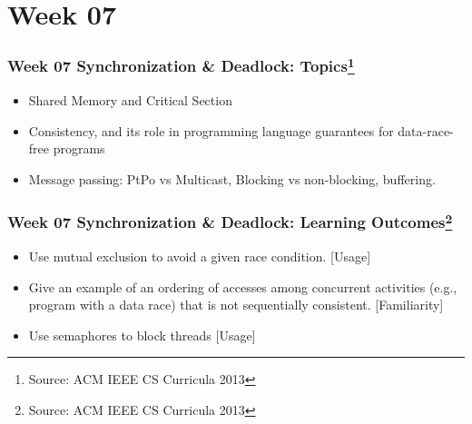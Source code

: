 
\section{Week 07}
\begin{frame}[fragile]
\frametitle{Week 07 Synchronization \& Deadlock:
Topics\footnote{Source: ACM IEEE CS Curricula 2013}}

\begin{itemize}
\item Shared Memory and Critical Section
\item Consistency, and its role in programming language guarantees for data-race-free programs
\item Message passing: PtPo vs Multicast, Blocking vs non-blocking, buffering.
\end{itemize}
\end{frame}

\begin{frame}[fragile]
\frametitle{Week 07 Synchronization \& Deadlock:
Learning Outcomes\footnote{Source: ACM IEEE CS Curricula 2013}}
\begin{itemize}
\item Use mutual exclusion to avoid a given race condition. [Usage]
\item Give an example of an ordering of accesses among concurrent activities (e.g., program with a data race) that is not sequentially consistent. [Familiarity]
\item Use semaphores to block threads [Usage]
\end{itemize}

\end{frame}

